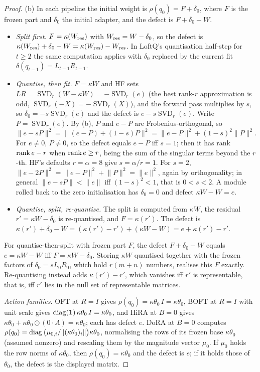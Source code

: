 \begin{proof}
(b) In each pipeline the initial weight is $\rho(q_0)=F+\delta_0$, where $F$ is the frozen part and $\delta_0$ the initial
adapter, and the defect is $F+\delta_0-W$.
\begin{itemize}
  \item \emph{Split first.} $F=\kappa(W_{\rm res})$ with $W_{\rm res}=W-\delta_0$, so the defect is
  $\kappa(W_{\rm res})+\delta_0-W=\kappa(W_{\rm res})-W_{\rm res}$. In LoftQ's quantisation half-step for $t\ge2$ the same
  computation applies with $\delta_0$ replaced by the current fit $\delta(q_{t-1})=L_{t-1}R_{t-1}$.
  \item \emph{Quantise, then fit.} $F=\kappa W$ and HF sets $L R=\operatorname{SVD}_r(W-\kappa W)=-\operatorname{SVD}_r(e)$
  (the best rank-$r$ approximation is odd, $\operatorname{SVD}_r(-X)=-\operatorname{SVD}_r(X)$), and the forward pass
  multiplies by $s$, so $\delta_0=-s\operatorname{SVD}_r(e)$ and the defect is $e-s\operatorname{SVD}_r(e)$. Write
  $P=\operatorname{SVD}_r(e)$. By (b), $P$ and $e-P$ are Frobenius-orthogonal, so
  $\lVert e-sP\rVert^2=\lVert(e-P)+(1-s)P\rVert^2=\lVert e-P\rVert^2+(1-s)^2\lVert P\rVert^2$. For $e\ne0$, $P\ne0$, so the
  defect equals $e-P$ iff $s=1$; then it has rank $\operatorname{rank} e-r$ when $\operatorname{rank} e\ge r$, being the sum of the singular terms beyond
  the $r$-th. HF's defaults $r=\alpha=8$ give $s=\alpha/r=1$. For $s=2$, $\lVert e-2P\rVert^2=\lVert e-P\rVert^2+\lVert
  P\rVert^2=\lVert e\rVert^2$, again by orthogonality; in general $\lVert e-sP\rVert<\lVert e\rVert$ iff $(1-s)^2<1$, that is
  $0<s<2$. A module rolled back to the zero initialisation has $\delta_0=0$ and defect $\kappa W-W=e$.
  \item \emph{Quantise, split, re-quantise.} The split is computed from $\kappa W$, the residual $r'=\kappa W-\delta_0$ is
  re-quantised, and $F=\kappa(r')$. The defect is $\kappa(r')+\delta_0-W=(\kappa(r')-r')+(\kappa W-W)=e+\kappa(r')-r'$.
\end{itemize}
For quantise-then-split with frozen part $F$, the defect $F+\delta_0-W$ equals $e=\kappa W-W$ iff $F=\kappa W-\delta_0$.
Storing $\kappa W$ quantised together with the frozen factors of $\delta_0=sL_0R_0$, which hold $r(m+n)$ numbers, realises
this $F$ exactly. Re-quantising instead adds $\kappa(r')-r'$, which vanishes iff $r'$ is representable, that is, iff $r'$
lies in the null set of representable matrices.

\emph{Action families.} OFT at $R=I$ gives $\rho(q_0)=\kappa\theta_0\,I=\kappa\theta_0$, BOFT at $R=I$ with unit scale gives
$\operatorname{diag}(\mathbf 1)\,\kappa\theta_0\,I=\kappa\theta_0$, and HiRA at $B=0$ gives $\kappa\theta_0+\kappa\theta_0\odot(0\cdot
A)=\kappa\theta_0$; each has defect $e$. DoRA at $B=0$ computes $\rho(q_0)=\operatorname{diag}\big(\mu_{0,i}/\lVert(\kappa\theta_0)_i\rVert\big)
\kappa\theta_0$, normalising the rows of its frozen base $\kappa\theta_0$ (assumed nonzero) and rescaling them by the
magnitude vector $\mu_0$. If $\mu_0$ holds the row norms of $\kappa\theta_0$, then $\rho(q_0)=\kappa\theta_0$ and the defect
is $e$; if it holds those of $\theta_0$, the defect is the displayed matrix.


\end{proof}
